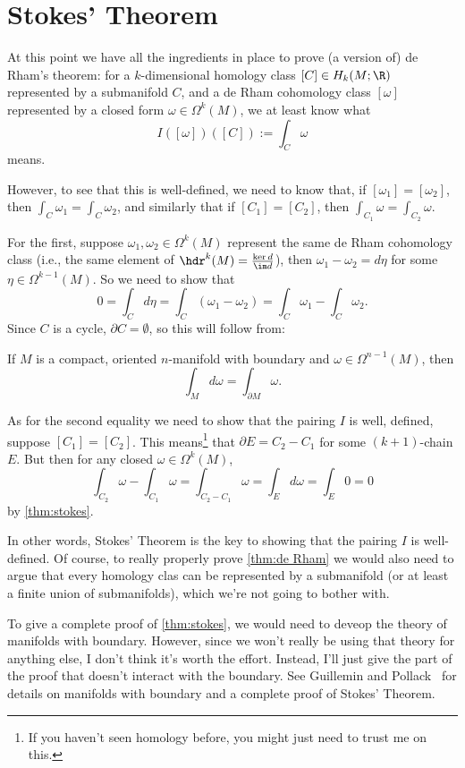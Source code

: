 \section{Stokes' Theorem} 
\label{sec:stokes_theorem}

At this point we have all the ingredients in place to prove (a version of) de Rham's theorem: for a $k$-dimensional homology class $[C] \in H_k(M;\R)$ represented by a submanifold $C$, and a de Rham cohomology class $[\omega]$ represented by a closed form $\omega \in \Omega^k(M)$, we at least know what
\[
	I([\omega])([C]) := \int_C\omega
\]
means.

However, to see that this is well-defined, we need to know that, if $[\omega_1] = [\omega_2]$, then $\int_C \omega_1 = \int_C \omega_2$, and similarly that if $[C_1] = [C_2]$, then $\int_{C_1}\omega = \int_{C_2}\omega$.

For the first, suppose $\omega_1, \omega_2 \in \Omega^k(M)$ represent the same de Rham cohomology class (i.e., the same element of $\hdr^k(M) = \frac{\ker d}{\im d}$), then $\omega_1 - \omega_2 = d\eta$ for some $\eta \in \Omega^{k-1}(M)$. So we need to show that
\[
	0 = \int_C d\eta = \int_C(\omega_1 - \omega_2) = \int_C \omega_1 - \int_C \omega_2.
\]
Since $C$ is a cycle, $\partial C = \emptyset$, so this will follow from:

\begin{theorem}\label{thm:stokes}
	If $M$ is a compact, oriented $n$-manifold with boundary and $\omega \in \Omega^{n-1}(M)$, then
	\[
		\int_M d\omega = \int_{\partial M} \omega.
	\]
\end{theorem}

As for the second equality we need to show that the pairing $I$ is well, defined, suppose $[C_1] = [C_2]$. This means\footnote{If you haven't seen homology before, you might just need to trust me on this.} that $\partial E = C_2 - C_1$ for some $(k+1)$-chain $E$. But then for any closed $\omega \in \Omega^k(M)$,
\[
	\int_{C_2} \omega - \int_{C_1}\omega = \int_{C_2-C_1} \omega = \int_E d \omega = \int_E 0 = 0
\]
by \cref{thm:stokes}. 

In other words, Stokes' Theorem is the key to showing that the pairing $I$ is well-defined. Of course, to really properly prove \cref{thm:de Rham} we would also need to argue that every homology clas can be represented by a submanifold (or at least a finite union of submanifolds), which we're not going to bother with.

To give a complete proof of \cref{thm:stokes}, we would need to deveop the theory of manifolds with boundary. However, since we won't really be using that theory for anything else, I don't think it's worth the effort. Instead, I'll just give the part of the proof that doesn't interact with the boundary. See Guillemin and Pollack~\cite{guilleminDifferentialTopology2010} for details on manifolds with boundary and a complete proof of Stokes' Theorem.

